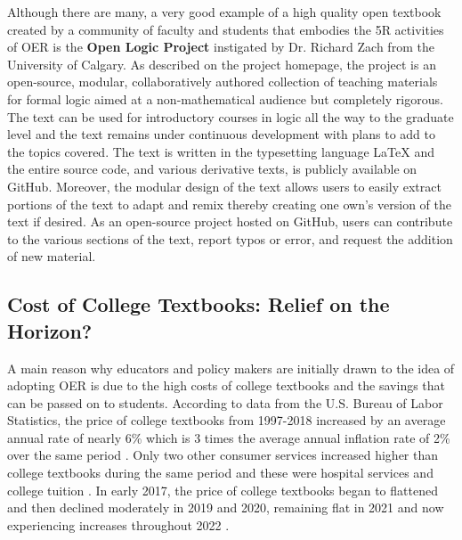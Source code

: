 \documentclass[11pt]{article}
\newcommand{\alink}[2]{\href{#1}{\textcolor{blue}{#2}}}
\begin{document}
Although there are many, a very good example of a high quality open textbook created by a community of faculty and students that embodies the 5R activities of OER is the \textbf{Open Logic Project} instigated by Dr.\/ Richard Zach from the University of Calgary.  As described on the project homepage, the project is an open-source, modular, collaboratively authored collection of teaching materials for formal logic aimed at a non-mathematical audience but completely rigorous. The text can be used for introductory courses in logic all the way to the graduate level and the text remains under continuous development with plans to add to the topics covered.  The text is written in the typesetting language LaTeX and the entire source code, and various derivative texts, is publicly available on GitHub.  Moreover, the modular design of the text allows users to easily extract portions of the text to adapt and remix thereby creating one own's version of the text if desired.  As an open-source project hosted on GitHub, users can contribute to the various sections of the text, report typos or error, and request the addition of new material.

\subsection{Cost of College Textbooks: Relief on the Horizon?}
A main reason why educators and policy makers are initially drawn to the idea of adopting OER is due to the high costs of college textbooks and the savings that can be passed on to students.  According to data from the U.S. Bureau of Labor Statistics, the price of college textbooks from 1997-2018 increased by an average annual rate of nearly 6\% which is 3 times the average annual inflation rate of 2\% over the same period \cite{bls}. Only two other consumer services increased higher than college textbooks during the same period and these were hospital services and college tuition \cite{perry2018}. %
In early 2017, the price of college textbooks began to flattened and then declined moderately in 2019 and 2020, remaining flat in 2021 and now experiencing increases throughout 2022 \cite{bls,perry2022}.
\end{document}
